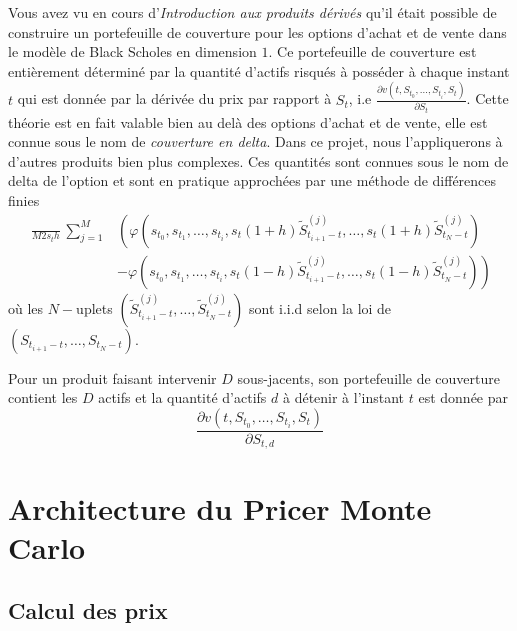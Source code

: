 \documentclass[a4paper,11pt]{article}
\def\expp#1{\mathop {\mathrm{e}^{ #1}}}
\begin{document}
Vous avez vu en cours d'{\it Introduction aux produits dérivés} qu'il était
possible de construire un portefeuille de couverture pour les options d'achat et
de vente dans le modèle de Black Scholes en dimension $1$. Ce portefeuille de
couverture est entièrement déterminé par la quantité d'actifs risqués à posséder
à chaque instant $t$ qui est donnée par la dérivée du prix par rapport à $S_t$,
i.e $\frac{\partial v(t, S_{t_0}, \dots, S_{t_i}, S_{t})}{\partial S_t}$.
Cette théorie est en fait valable bien au delà des options d'achat et de vente,
elle est connue sous le nom de {\it couverture en delta}. Dans ce projet, nous
l'appliquerons à d'autres produits bien plus complexes.  Ces quantités sont
connues sous le nom de delta de l'option et sont en pratique approchées par une
méthode de différences finies
\begin{align}
  \label{delta_t}
  \frac{\expp{-r (T - t)}}{M  2 s_t h} \sum_{j=1}^M & \left ( \varphi(s_{t_0}, s_{t_1}, \dots,
  s_{t_i}, s_t(1+h) \tilde S_{t_{i+1} - t}^{(j)}, \dots,  s_t(1+h) \tilde S_{t_N -
  t}^{(j)}) \right. \nonumber \\
  & \left. - \varphi(s_{t_0}, s_{t_1}, \dots,
  s_{t_i}, s_t(1-h) \tilde S_{t_{i+1} - t}^{(j)}, \dots,  s_t (1-h) \tilde
  S_{t_N - t}^{(j)}) \right)
\end{align}
où les $N-$uplets $(\tilde S_{t_{i+1} - t}^{(j)}, \dots, \tilde S_{t_N -
t}^{(j)})$ sont i.i.d selon la loi de $(S_{t_{i+1} - t}, \dots, S_{t_N - t})$.

Pour un produit faisant intervenir $D$ sous-jacents, son portefeuille de
couverture contient les $D$ actifs et la quantité d'actifs $d$ à détenir à
l'instant $t$ est donnée par
\begin{equation*}
  \frac{\partial v(t, S_{t_0}, \dots, S_{t_i}, S_{t})}{\partial S_{t,d}}
\end{equation*}

\section{Architecture du Pricer Monte Carlo}
\label{sec:archi}
\subsection{Calcul des prix}

\end{document}

